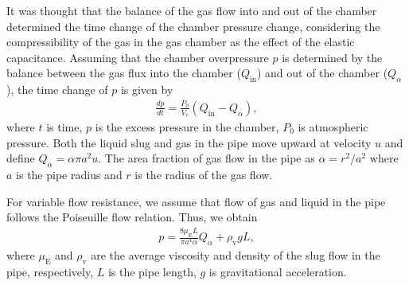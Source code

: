 \documentclass[aps,pre,preprint,groupedaddress,showkeys]{revtex4-2}
\begin{document}
It was thought that the balance of the gas flow into and out of the chamber determined the time change of the chamber pressure change, considering the compressibility of the gas in the gas chamber as the effect of the elastic capacitance.
Assuming that the chamber overpressure $p$ is determined by the balance between the gas flux into the chamber ($ Q_ \mathrm{in} $) and out of the chamber ($ Q_ \alpha $), the time change of $ p $ is given by
\begin{eqnarray}
\frac{dp}{dt}=\frac{P_0}{V_\mathrm{c}} \left(  Q_\mathrm{in} - Q_\alpha \right),
\label{dpdtex}
\end{eqnarray}
where $t$ is time, $p$ is the excess pressure in the chamber, $P_0$ is atmospheric pressure.
Both the liquid slug and gas in the pipe move upward at velocity $u$ and define $Q_\alpha = \alpha \pi a^2 u$. 
The area fraction of gas flow in the pipe as $\alpha = r^2/a^2$ where $a$ is the pipe radius and $r$ is the radius of the gas flow.


For variable flow resistance, we assume that flow of gas and liquid in the pipe follows the Poiseuille flow relation. 
Thus, we obtain
\begin{eqnarray}
p=\frac{8\mu_\mathrm{E} L}{\pi a^4 \alpha} Q_\alpha  + \rho_\mathrm{v} g L,
\label{pdropex}
\end{eqnarray}
where $\mu_\mathrm{E}$ and $\rho_\mathrm{v}$ are the average viscosity and density of the slug flow in the pipe, respectively, $L$ is the pipe length, $g$ is gravitational acceleration.
\end{document}
